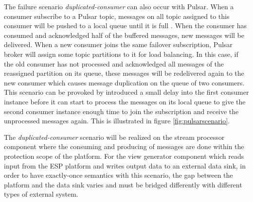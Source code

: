 The failure scenario \emph{duplicated-consumer} can also occur with Pulsar. When a consumer subscribe to a Pulsar topic, messages on all topic assigned to this consumer will be pushed to a local queue until it is full \cite{pulsarbinaryprotocol}. When the consumer has consumed and acknowledged half of the buffered messages, new messages will be delivered. When a new consumer joins the same failover subscription, Pulsar broker will assign some topic partitions to it for load balancing. In this case, if the old consumer has not processed and acknowledged all messages of the reassigned partition on its queue, these messages will be redelivered again to the new consumer which causes message duplication on the queue of two consumers. This scenario can be provoked by introduced a small delay into the first consumer instance before it can start to process the messages on its local queue to give the second consumer instance enough time to join the subscription and receive the unprocessed messages again. This is illustrated in figure \ref{fig:pulsarscenario}.

The \emph{duplicated-consumer} scenario will be realized on the stream processor component where the consuming and producing of messages are done within the protection scope of the platform. For the view generator component which reads input from the ESP platform and writes output data to an external data sink, in order to have exactly-once semantics with this scenario, the gap between the platform and the data sink varies and must be bridged differently with different types of external system.

